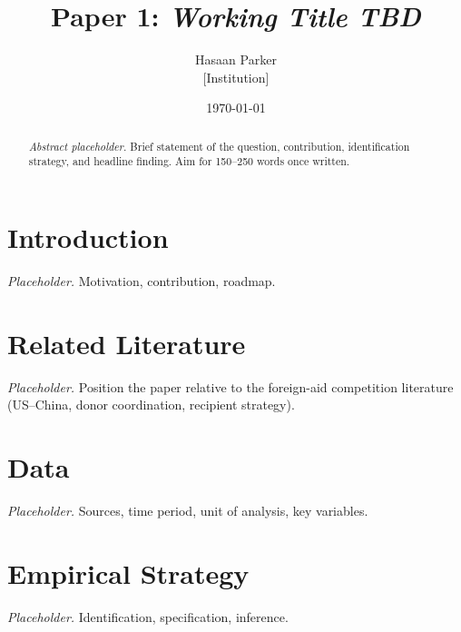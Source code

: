 \documentclass[12pt]{article}
\title{Paper 1: \textit{Working Title TBD}}
\author{Hasaan Parker \\ \small{[Institution]}}
\date{\today}
\begin{document}
\maketitle

\begin{abstract}
\noindent
\textit{Abstract placeholder.} Brief statement of the question, contribution,
identification strategy, and headline finding. Aim for 150--250 words once
written.
\end{abstract}

\section{Introduction}

\textit{Placeholder.} Motivation, contribution, roadmap.

\section{Related Literature}

\textit{Placeholder.} Position the paper relative to the foreign-aid
competition literature (US--China, donor coordination, recipient strategy).

\section{Data}

\textit{Placeholder.} Sources, time period, unit of analysis, key variables.

\section{Empirical Strategy}

\textit{Placeholder.} Identification, specification, inference.

\end{document}
